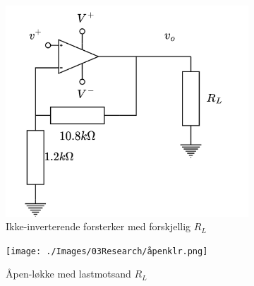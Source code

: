     \begin{figure}[H]
        \centering
        \begin{subfigure}{.5\textwidth}
            \centering
            \includegraphics[width=1\linewidth]{./Images/03Research/opamp.drawio.png}
            \caption{Ikke-inverterende forsterker med forskjellig $R_L$}
            \label{fig:ikkeinver}
        \end{subfigure}%
        \begin{subfigure}{.5\textwidth}
            \centering
            \texttt{[image: ./Images/03Research/åpenklr.png]}
            \caption{Åpen-løkke med lastmotsand $R_L$}
            \label{fig:åpenmløkke}
        \end{subfigure}
        \caption{\cite{pham_2022_selvlaget}}
        \label{fig:testeer}
    \end{figure}


